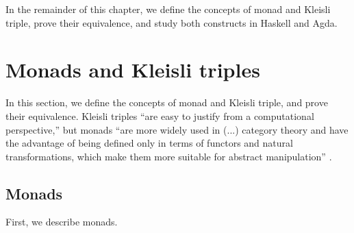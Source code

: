 In the remainder of this chapter, we define the concepts of monad and
Kleisli triple, prove their equivalence, and study both constructs in
Haskell and Agda.

\section{Monads and Kleisli triples}
\label{sec:monads}

In this section, we define the concepts of monad and Kleisli triple,
and prove their equivalence. Kleisli triples ``are easy to justify
from a computational perspective,'' but monads ``are more widely used
in (...) category theory and have the advantage of being defined only
in terms of functors and natural transformations, which make them more
suitable for abstract manipulation'' \parencite[60]{moggi-1991}.

\subsection*{Monads}

First, we describe monads.

